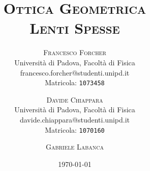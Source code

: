\title{
\vspace{-2cm}
\fontsize{60pt}{10pt}\selectfont
\textsc{Ottica Geometrica \\[3mm] Lenti Spesse}}
\author{
\large
\textsc{Francesco Forcher}\\[2mm]
\normalsize Università di Padova, Facoltà di Fisica\\
\normalsize francesco.forcher@studenti.unipd.it\\
\normalsize Matricola: \texttt{1073458}\\
\and
\large
\textsc{Davide Chiappara}\\[2mm]
\normalsize Università di Padova, Facoltà di Fisica\\
\normalsize davide.chiappara@studenti.unipd.it\\
\normalsize Matricola: \texttt{1070160}\\
\and
\large
\textsc{Gabriele Labanca}\\[2mm]
}
\date{\today}
